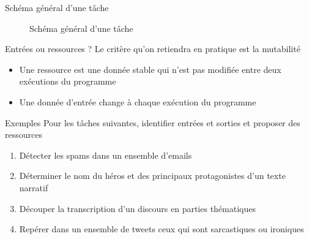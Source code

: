 \documentclass[hyperref={unicode}, xcolor={svgnames}]{beamer}
\begin{document}
\begin{frame}[fragile]{Schéma général d'une tâche}
    \begin{figure}
    \caption{Schéma général d'une tâche}
    \end{figure}
\end{frame}

\begin{frame}{Entrées ou ressources ?}
    Le critère qu'on retiendra en pratique est la mutabilité
    \begin{itemize}
        \item Une ressource est une donnée stable qui n'est pas modifiée entre deux exécutions du programme
        \item Une donnée d'entrée change à chaque exécution du programme
    \end{itemize}
\end{frame}

\begin{frame}{Exemples}
    Pour les tâches suivantes, identifier entrées et sorties et proposer des ressources
    \begin{enumerate}
        \item Détecter les spams dans un ensemble d'emails
        \item Déterminer le nom du héros et des principaux protagonistes d'un texte narratif
        \item Découper la transcription d'un discours en parties thématiques
        \item Repérer dans un ensemble de tweets ceux qui sont sarcastiques ou ironiques
    \end{enumerate}
\end{frame}
\end{document}
